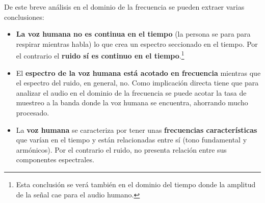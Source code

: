 De este breve análisis en el dominio de la frecuencia se pueden extraer varias conclusiones:
\begin{itemize}
	\item \textbf{La voz humana no es continua en el tiempo} (la persona se para para respirar mientras habla) lo que crea un espectro seccionado en el tiempo. Por el contrario el \textbf{ruido sí es continuo en el tiempo}.\footnote{Esta conclusión se verá también en el dominio del tiempo donde la amplitud de la señal cae para el audio humano.}
	\item El \textbf{espectro de la voz humana está acotado en frecuencia} mientras que el espectro del ruido, en general, no. Como implicación directa tiene que para analizar el audio en el dominio de la frecuencia se puede acotar la tasa de muestreo a la banda donde la voz humana se encuentra, ahorrando mucho procesado.
	\item La \textbf{voz humana} se caracteriza por tener unas \textbf{frecuencias características} que varían en el tiempo y están relacionadas entre sí (tono fundamental y armónicos). Por el contrario el ruido, no presenta relación entre sus componentes espectrales.
\end{itemize}